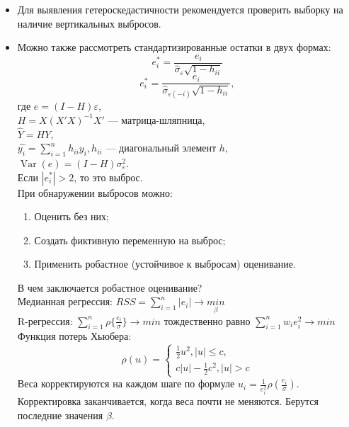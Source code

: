 \documentclass[a0,final]{a0poster}
\DeclareMathOperator{\Var}{Var}
\begin{document}
\begin{multicols}{4}
\begin{itemize}
\item Для выявления гетероскедастичности рекомендуется проверить выборку на наличие вертикальных выбросов.
\item Можно также рассмотреть стандартизированные остатки в двух формах: \[e^*_i = \frac{e_i}{\hat{\sigma}_\varepsilon \sqrt{1 - h_{ii}}}\] \[e^*_i = \frac{e_i}{\hat{\sigma}_{\varepsilon(-i)} \sqrt{1 - h_{ii}}},\]где
$e = (I - H)\varepsilon,$\\
$H = X(X'X)^{-1}X'$ — матрица-шляпница,\\
$\hat{Y} = HY, $\\
$\hat{y_i} = \sum\limits_{i=1}^n {h_{ii}y_{i}}, h_{ii}$ — диагональный элемент $h$,\\
$\Var(e) = (I - H)\sigma^2_\varepsilon.$\\
Если $|e_i^*| > 2$, то это выброс.\\
При обнаружении выбросов можно:
\begin{enumerate}
    \item Оценить без них;
    \item Создать фиктивную переменную на выброс;
    \item Применить робастное (устойчивое к выбросам) оценивание.
\end{enumerate}
В чем заключается робастное оценивание? \\
Медианная регрессия: $RSS = \sum\limits_{i=1}^n{|e_i|} \rightarrow \underset{\beta}{min}$\\
R-регрессия: $\sum\limits_{i=1}^n{\rho\{\frac{e_i}{\sigma}\}} \rightarrow {min}$ тождественно равно $\sum\limits_{i=1}^n{w_ie_i^2} \rightarrow {min}$ \\
Функция потерь Хьюбера:\\
\begin{equation*}
\rho(u) =
 \begin{cases}
   \frac{1}{2}u^2, |u| \leq c,\\
   c|u| - \frac{1}{2}c^2, |u| > c
 \end{cases}
\end{equation*}
Веса корректируются на каждом шаге по формуле $u_i = \frac{1}{e^2_i}\rho(\frac{e_i}{\sigma})$. Корректировка заканчивается, когда веса почти не меняются. Берутся последние значения $\beta$.\\
\end{itemize}


\end{multicols}
\end{document}
